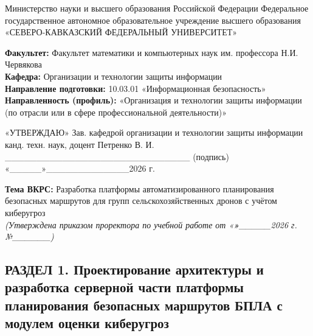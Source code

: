 \documentclass[14pt,a4paper]{extarticle}
\begin{document}
Министерство науки и высшего образования Российской Федерации Федеральное государственное автономное образовательное учреждение высшего образования «СЕВЕРО-КАВКАЗСКИЙ ФЕДЕРАЛЬНЫЙ УНИВЕРСИТЕТ»

\textbf{Факультет:} Факультет математики и компьютерных наук им. профессора Н.И. Червякова\\
\textbf{Кафедра:} Организации и технологии защиты информации\\
\textbf{Направление подготовки:} 10.03.01 «Информационная безопасность»\\
\textbf{Направленность (профиль):} «Организация и технологии защиты информации (по отрасли или в сфере профессиональной деятельности)»

«УТВЕРЖДАЮ» Зав. кафедрой организации и технологии защиты информации канд. техн. наук, доцент Петренко В. И. \_\_\_\_\_\_\_\_\_\_\_\_\_\_\_\_\_\_\_\_\_\_\_\_\_\_\_\_\_ (подпись) «\_\_\_\_\_»\_\_\_\_\_\_\_\_\_\_\_\_\_2026 г.

\textbf{Тема ВКРС:} Разработка платформы автоматизированного планирования безопасных маршрутов для групп сельскохозяйственных дронов с учётом киберугроз\\
\emph{(Утверждена приказом проректора по учебной работе от «\textbf{\emph{»}}\_\_\_\_\_2026 г. №\_\_\_\_\_\_)}


\hypertarget{ux440ux430ux437ux434ux435ux43b-1.-ux43fux440ux43eux435ux43aux442ux438ux440ux43eux432ux430ux43dux438ux435-ux430ux440ux445ux438ux442ux435ux43aux442ux443ux440ux44b-ux438-ux440ux430ux437ux440ux430ux431ux43eux442ux43aux430-ux441ux435ux440ux432ux435ux440ux43dux43eux439-ux447ux430ux441ux442ux438-ux43fux43bux430ux442ux444ux43eux440ux43cux44b-ux43fux43bux430ux43dux438ux440ux43eux432ux430ux43dux438ux44f-ux431ux435ux437ux43eux43fux430ux441ux43dux44bux445-ux43cux430ux440ux448ux440ux443ux442ux43eux432-ux431ux43fux43bux430-ux441-ux43cux43eux434ux443ux43bux435ux43c-ux43eux446ux435ux43dux43aux438-ux43aux438ux431ux435ux440ux443ux433ux440ux43eux437}{%
\subsection{РАЗДЕЛ 1. Проектирование архитектуры и разработка серверной части платформы планирования безопасных маршрутов БПЛА с модулем оценки киберугроз}\label{ux440ux430ux437ux434ux435ux43b-1.-ux43fux440ux43eux435ux43aux442ux438ux440ux43eux432ux430ux43dux438ux435-ux430ux440ux445ux438ux442ux435ux43aux442ux443ux440ux44b-ux438-ux440ux430ux437ux440ux430ux431ux43eux442ux43aux430-ux441ux435ux440ux432ux435ux440ux43dux43eux439-ux447ux430ux441ux442ux438-ux43fux43bux430ux442ux444ux43eux440ux43cux44b-ux43fux43bux430ux43dux438ux440ux43eux432ux430ux43dux438ux44f-ux431ux435ux437ux43eux43fux430ux441ux43dux44bux445-ux43cux430ux440ux448ux440ux443ux442ux43eux432-ux431ux43fux43bux430-ux441-ux43cux43eux434ux443ux43bux435ux43c-ux43eux446ux435ux43dux43aux438-ux43aux438ux431ux435ux440ux443ux433ux440ux43eux437}}
\end{document}
